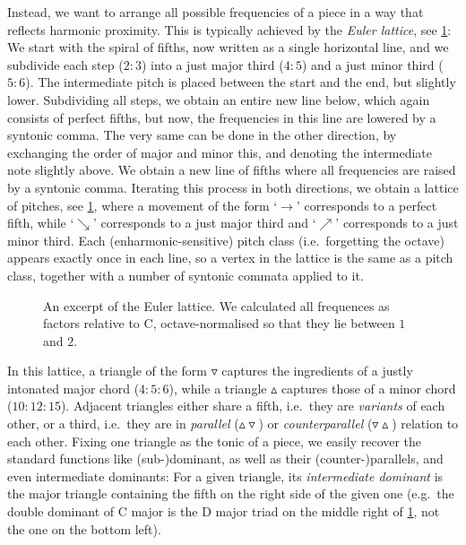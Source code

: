 \documentclass[british,11pt]{scrartcl}
\begin{document}
Instead, we want to arrange all possible frequencies of a piece in a way that
reflects harmonic proximity. This is typically achieved by the \emph{Euler
  lattice}, see \cref{fig:latticeExcerpt}: We start with the spiral of fifths,
now written as a single horizontal line, and we subdivide each step ($2:3$) into
a just major third ($4:5$) and a just minor third ($5:6$). The intermediate
pitch is placed between the start and the end, but slightly lower. Subdividing
all steps, we obtain an entire new line below, which again consists of perfect
fifths, but now, the frequencies in this line are lowered by a syntonic comma.
The very same can be done in the other direction, by exchanging the order of
major and minor this, and denoting the intermediate note slightly above.  We
obtain a new line of fifths where all frequencies are raised by a syntonic
comma. Iterating this process in both directions, we obtain a lattice of
pitches, see \cref{fig:latticeExcerpt}, where a movement of the form ‘$\to$’
corresponds to a perfect fifth, while ‘$\searrow$’ corresponds to a just major
third and ‘$\nearrow$’ corresponds to a just minor third. Each
(enharmonic-sensitive) pitch class (i.e.\ forgetting the octave) appears exactly
once in each line, so a vertex in the lattice is the same as a pitch class,
together with a number of syntonic commata applied to it.

\begin{figure}[h]
  
  \caption{An excerpt of the Euler lattice. We calculated all frequences as
    factors relative to C, octave-normalised so that they lie between $1$ and
    $2$.}\label{fig:latticeExcerpt}
\end{figure}

In this lattice, a triangle of the form $\triangledown$ captures the ingredients
of a justly intonated major chord ($4:5:6$), while a triangle $\vartriangle$
captures those of a minor chord ($10:12:15$). Adjacent triangles either share a
fifth, i.e.\ they are \emph{variants} of each other, or a third, i.e.\ they are
in \emph{parallel} ($\vartriangle\!\!\!\triangledown$) or \emph{counterparallel}
($\triangledown\!\!\!\vartriangle$) relation to each other.  Fixing one triangle
as the tonic of a piece, we easily recover the standard functions like
(sub-)dominant, as well as their (counter-)parallels, and even intermediate
dominants: For a given triangle, its \emph{intermediate dominant} is the major
triangle containing the fifth on the right side of the given one (e.g.\ the
double dominant of C major is the D major triad on the middle right of
\cref{fig:latticeExcerpt}, not the one on the bottom left).
\end{document}

